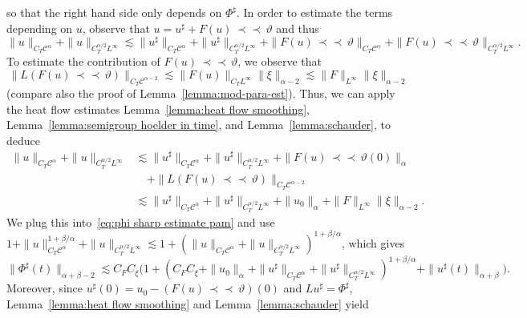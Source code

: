 \documentclass[a4paper,11pt]{article}
\newcommand{\mathd}{\mathrm{d}}
\theoremstyle{remark}
\newcommand{\CC}{\ensuremath{\mathscr{C}}}
\newcommand{\mpara}{\,\mathord{\prec\!\!\!\prec}\,}
\begin{document}
so that the right hand side only depends on $\Phi^{\sharp}$. In order to
estimate the terms depending on $u$, observe that $u = u^\sharp + F(u) \mpara \vartheta$ and thus
\[
   \|u\|_{C_T\CC^\alpha} + \|u\|_{C^{\alpha/2}_TL^\infty} \lesssim \|u^\sharp\|_{C_T\CC^\alpha} + \|u^\sharp\|_{C^{\alpha/2}_T L^\infty} + \| F(u) \mpara \vartheta \|_{C_T\CC^\alpha} +  \| F(u) \mpara \vartheta \|_{C^{\alpha/2}_TL^\infty}.
\]
To estimate the contribution of $F(u) \mpara \vartheta$, we observe that
\[
   \|L(F(u)\mpara \vartheta)\|_{C_T \CC^{\alpha-2}} \lesssim \|F(u)\|_{C_TL^\infty} \|\xi\|_{\alpha-2} \lesssim \|F\|_{L^\infty} \|\xi\|_{\alpha-2}
\]
(compare also the proof of Lemma~\ref{lemma:mod-para-est}). Thus, we can apply the heat flow estimates Lemma~\ref{lemma:heat flow smoothing}, Lemma~\ref{lemma:semigroup hoelder in time}, and Lemma~\ref{lemma:schauder}, to deduce
\begin{align*}
   \| u \|_{C_{T} \CC^\alpha} + \|u\|_{C^{\alpha/2}_TL^\infty} & \lesssim \| u^\sharp \|_{C_{T} \CC^\alpha} + \|u^\sharp \|_{C^{\alpha/2}_TL^\infty} + \|F(u) \mpara \vartheta(0)\|_\alpha \\
   &\quad + \| L (F(u) \mpara \vartheta) \|_{C_T\CC^{\alpha-2}} \\
   & \lesssim \| u^\sharp \|_{C_{T} \CC^\alpha} + \|u^\sharp \|_{C^{\alpha/2}_TL^\infty} + \|u_0\|_\alpha + \|F\|_{L^\infty}  \|\xi\|_{\alpha-2}.
\end{align*}
We plug this into~\eqref{eq:phi sharp estimate pam} and use $1 + \|u\|_{C_T\CC^\alpha}^{1+\beta/\alpha} + \|u\|_{C^{\alpha/2}_TL^\infty} \lesssim 1 + (\|u\|_{C_T\CC^\alpha} + \|u\|_{C^{\alpha/2}_TL^\infty})^{1+\beta/\alpha}$, which gives
\[
   \| \Phi^{\sharp} ( t ) \|_{\alpha + \beta - 2} \lesssim C_F C_\xi \big( 1 + (C_F C_\xi + \|u_0\|_\alpha + \| u^\sharp \|_{C_{T} \CC^\alpha} + \|u^\sharp \|_{C^{\alpha/2}_TL^\infty})^{1+\beta/\alpha} + \|u^\sharp (t)\|_{\alpha+\beta}\big).
\]
Moreover, since $u^{\sharp} ( 0 ) =u_{0} - ( F ( u ) \mpara \vartheta ) ( 0)$ and $L u^{\sharp} = \Phi^{\sharp}$, Lemma~\ref{lemma:heat flow smoothing} and Lemma~\ref{lemma:schauder} yield
\end{document}
